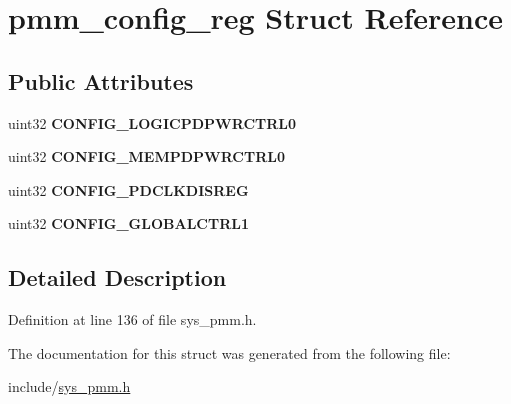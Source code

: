 \hypertarget{structpmm__config__reg}{}\section{pmm\+\_\+config\+\_\+reg Struct Reference}
\label{structpmm__config__reg}
\subsection*{Public Attributes}
\begin{DoxyCompactItemize}
\item 
\mbox{\label{structpmm__config__reg_a4c46e0fca70c7b5aa37ae4ce0ac203d0}} 
uint32 {\bfseries C\+O\+N\+F\+I\+G\+\_\+\+L\+O\+G\+I\+C\+P\+D\+P\+W\+R\+C\+T\+R\+L0}
\item 
\mbox{\label{structpmm__config__reg_a540b84a7543a58f707cf54228fc26b65}} 
uint32 {\bfseries C\+O\+N\+F\+I\+G\+\_\+\+M\+E\+M\+P\+D\+P\+W\+R\+C\+T\+R\+L0}
\item 
\mbox{\label{structpmm__config__reg_aff44eed9740974194f66e217d33469e9}} 
uint32 {\bfseries C\+O\+N\+F\+I\+G\+\_\+\+P\+D\+C\+L\+K\+D\+I\+S\+R\+EG}
\item 
\mbox{\label{structpmm__config__reg_a18be71ec0cbc14bee83f8edf6395898d}} 
uint32 {\bfseries C\+O\+N\+F\+I\+G\+\_\+\+G\+L\+O\+B\+A\+L\+C\+T\+R\+L1}
\end{DoxyCompactItemize}


\subsection{Detailed Description}


Definition at line 136 of file sys\+\_\+pmm.\+h.



The documentation for this struct was generated from the following file\+:\begin{DoxyCompactItemize}
\item 
include/\mbox{\hyperlink{sys__pmm_8h}{sys\+\_\+pmm.\+h}}\end{DoxyCompactItemize}
